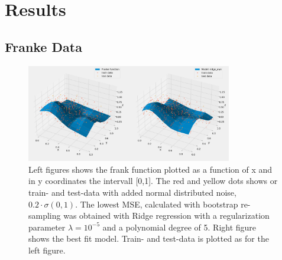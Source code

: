 \section{Results}

\subsection{Franke Data}
\begin{figure}[H]
    \centering
    \includegraphics[width=0.8\textwidth]{Figures/franke_data_and_model_ridge_best.png}
    \caption{Left figures shows the frank function plotted as a function of x
    and in y coordinates the intervall [0,1]. The red and yellow dots shows or
train- and test-data with added normal distributed noise, $0.2 \cdot
\sigma(0,1)$. The lowest MSE, calculated with bootstrap re-sampling was obtained
with Ridge regression with a regularization parameter $\lambda = 10^{-5}$ and a
polynomial degree of 5. Right figure shows the best fit model. Train- and
test-data is plotted as for the left figure.} 
\end{figure}

